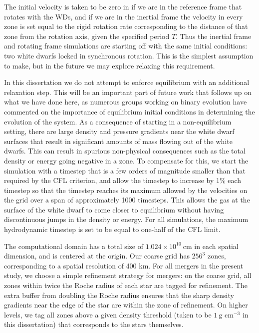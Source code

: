 \documentclass[12pt]{article}
\begin{document}
The initial velocity is taken to be zero in if we are in the reference
frame that rotates with the WDs, and if we are in the inertial frame
the velocity in every zone is set equal to the rigid rotation rate
corresponding to the distance of that zone from the rotation axis, given
the specified period $T$. Thus the inertial frame and rotating frame
simulations are starting off with the same initial conditions: two white
dwarfs locked in synchronous rotation. This is the simplest assumption to
make, but in the future we may explore relaxing this requirement.

In this dissertation we do not attempt to enforce equilibrium with an additional relaxation
step. This will be an important part of future work that follows up on
what we have done here, as numerous groups working on binary evolution
\citep{swc:2000,motl:2002,rosswog:2004,dan:2011,pakmor:2012:gadget}
have commented on the importance of equilibrium initial conditions in
determining the evolution of the system. As a consequence of starting
in a non-equilibrium setting, there are
large density and pressure gradients near the white dwarf surfaces
that result in significant amounts of mass flowing out of the white dwarfs.
This can result in spurious non-physical consequences such as
the total density or energy going negative in a zone. To compensate
for this, we start the simulation with a timestep that is a few orders
of magnitude smaller than that required by the CFL criterion, and allow
the timestep to increase by 1\% each timestep so that the timestep reaches
its maximum allowed by the velocities on the grid over a span of approximately
1000 timesteps. This allows the gas at the surface of the white dwarf
to come closer to equilibrium without having discontinuous jumps in the
density or energy. For all simulations, the maximum hydrodynamic timestep
is set to be equal to one-half of the CFL limit.

The computational domain has a total size of $1.024 \times
10^{10}\ \text{cm}$ in each spatial dimension, and is centered at the
origin. Our coarse grid has $256^3$ zones, corresponding to a spatial
resolution of 400 km. For all mergers in the present study, we choose a simple
refinement strategy for mergers: on the coarse grid, all zones within
twice the Roche radius of each star are tagged for refinement. The extra
buffer from doubling the Roche radius ensures that the sharp density gradients near
the edge of the star are within the zone of refinement. On higher levels,
we tag all zones above a given density threshold (taken to be $1\ \text{g cm}^{-3}$
in this dissertation) that corresponds to the stars themselves.
\end{document}
